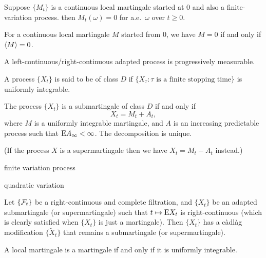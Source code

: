 \documentclass[10pt]{book}
\begin{document}

Suppose $\{M_t\}$ is a continuous local martingale started at $0$ and also a finite-variation process. then $M_t(\omega) =0$ for a.e.\ $\omega$ over $t\geq0$.

For a continuous local martingale $M$ started from $0$, we have $M = 0$ if and only if $\langle M \rangle = 0$.

\begin{prop}[Proposition~3.4]
    A left-continuous/right-continuous adapted process is progressively measurable.
\end{prop}

\begin{namedthm}
    
\end{namedthm}

\begin{namedthm}
    
\end{namedthm}

A process $\{X_t\}$ is said to be of class $D$ if $\{X_\tau : \tau\text{ is a finite stopping time}\}$ is uniformly integrable.

\begin{namedthm}
    The process $\{X_t\}$ is a submartingale of class $D$ if and only if \[
        X_t = M_t + A_t, 
    \] where $M$ is a uniformly integrable martingale, and $A$ is an increasing predictable process such that $\mathop{}\!\mathrm{E} A_\infty < \infty$. The decomposition is unique.

    (If the process $X$ is a supermartingale then we have $X_t = M_t - A_t$ instead.)
\end{namedthm}

\begin{namedthm}
    
\end{namedthm}

finite variation process

quadratic variation

Let $\{\mathcal{F}_t\}$ be a right-continuous and complete filtration, and $\{X_t\}$ be an adapted submartingale (or supermartingale) such that $t \mapsto \mathop{}\!\mathrm{E} X_t$ is right-continuous (which is clearly satisfied when $\{X_t\}$ is just a martingale). Then $\{X_t\}$ has a càdlàg modification $\{\widetilde{X}_t\}$ that remains a submartingale (or supermartingale).

A local martingale is a martingale if and only if it is uniformly integrable.
\end{document}
